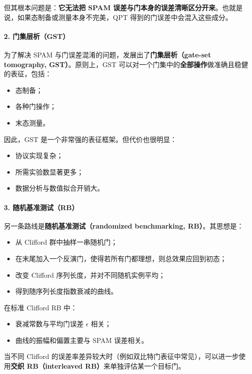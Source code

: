\documentclass[12pt,a4paper,oneside]{ctexbook}
\begin{document}
但其根本问题是：\textbf{它无法把 SPAM 误差与门本身的误差清晰区分开来}。也就是说，如果态制备或测量本身不完美，QPT 得到的门误差中会混入这些成分。

\paragraph{2. 门集层析（GST）}
为了解决 SPAM 与门误差混淆的问题，发展出了\textbf{门集层析（gate-set tomography, GST）}。原则上，GST 可以对一个门集中的\textbf{全部操作}做准确且稳健的表征，包括：
\begin{itemize}
    \item 态制备；
    \item 各种门操作；
    \item 末态测量。
\end{itemize}

因此，GST 是一个非常强的表征框架。但代价也很明显：
\begin{itemize}
    \item 协议实现复杂；
    \item 所需实验数显著更多；
    \item 数据分析与数值拟合开销大。
\end{itemize}

\paragraph{3. 随机基准测试（RB）}
另一条路线是\textbf{随机基准测试（randomized benchmarking, RB）}。其思想是：
\begin{itemize}
    \item 从 Clifford 群中抽样一串随机门；
    \item 在末尾加入一个反演门，使得若所有门都理想，则总效果应回到初态；
    \item 改变 Clifford 序列长度，并对不同随机实例平均；
    \item 得到随序列长度指数衰减的曲线。
\end{itemize}

在标准 Clifford RB 中：
\begin{itemize}
    \item 衰减常数与平均门误差 \(\epsilon\) 相关；
    \item 曲线的振幅和偏置主要与 SPAM 误差相关。
\end{itemize}

当不同 Clifford 的误差率差异较大时（例如双比特门表征中常见），可以进一步使用\textbf{交织 RB（interleaved RB）}来单独评估某一个目标门。
\end{document}
